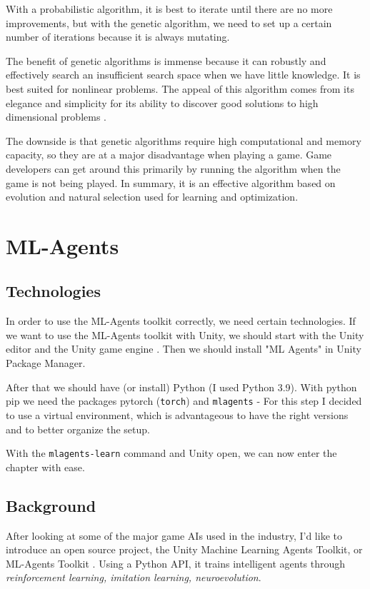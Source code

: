 \documentclass[a4paper,12pt,openright]{book}
\begin{document}
With a probabilistic algorithm, it is best to iterate until there are no more improvements, but with the genetic algorithm, we need to set up a certain number of iterations because it is always mutating.

The benefit of genetic algorithms is immense because it can robustly and effectively search an insufficient search space when we have little knowledge. It is best suited for nonlinear problems. The appeal of this algorithm comes from its elegance and simplicity for its ability to discover good solutions to high dimensional problems \cite{CurrentAIGames}.

The downside is that genetic algorithms require high computational and memory capacity, so they are at a major disadvantage when playing a game. Game developers can get around this primarily by running the algorithm when the game is not being played. In summary, it is an effective algorithm based on evolution and natural selection used for learning and optimization.

\chapter{ML-Agents}
\label{ch3}

\section{Technologies}

In order to use the ML-Agents toolkit correctly, we need certain technologies. If we want to use the ML-Agents toolkit with Unity, we should start with the Unity editor and the Unity game engine \cite{UnitySoftware}. Then we should install "ML Agents" in Unity Package Manager.

After that we should have (or install) Python \cite{PythonManual} (I used Python 3.9). With python pip we need the packages pytorch (\texttt{torch}) and \texttt{mlagents} - For this step I decided to use a virtual environment, which is advantageous to have the right versions and to better organize the setup.

With the \texttt{mlagents-learn} command and Unity open, we can now enter the chapter with ease.

\section{Background}

After looking at some of the major game AIs used in the industry, I'd like to introduce an open source project, the Unity Machine Learning Agents Toolkit, or ML-Agents Toolkit \cite{MLAgents}. Using a Python \cite{PythonManual} API, it trains intelligent agents through \emph{reinforcement learning, imitation learning, neuroevolution}.
\end{document}
